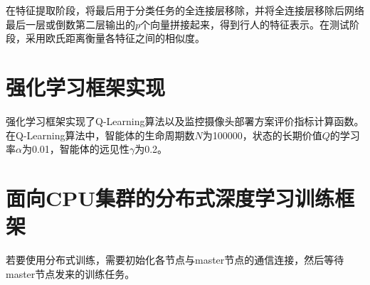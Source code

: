 在特征提取阶段，将最后用于分类任务的全连接层移除，并将全连接层移除后网络最后一层或倒数第二层输出的$p$个向量拼接起来，得到行人的特征表示。在测试阶段，采用欧氏距离衡量各特征之间的相似度。

\section{强化学习框架实现}

强化学习框架实现了Q-Learning算法以及监控摄像头部署方案评价指标计算函数。在Q-Learning算法中，智能体的生命周期数$N$为100000，状态的长期价值$Q$的学习率$\alpha$为0.01，智能体的远见性$\gamma$为0.2。

\section{面向CPU集群的分布式深度学习训练框架}

若要使用分布式训练，需要初始化各节点与master节点的通信连接，然后等待master节点发来的训练任务。